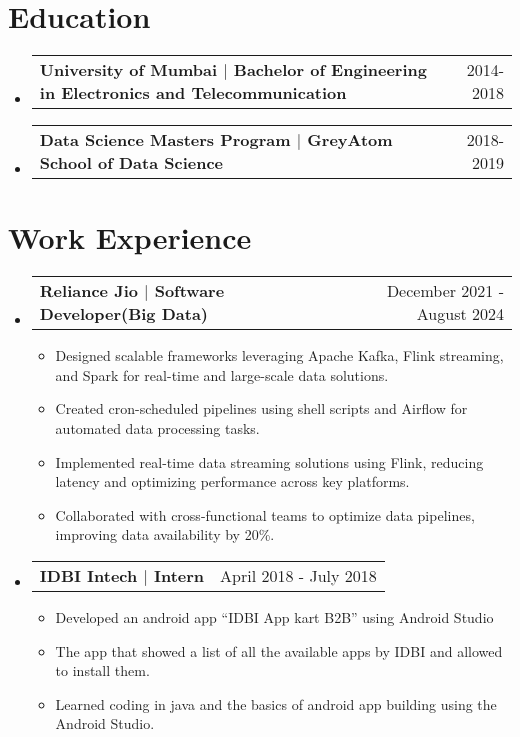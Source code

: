 \documentclass[letterpaper,10pt]{article}
\makeatletter
\newcommand{\resumeItem}[1]{
    \item\small{
      {#1 \vspace{-2pt}}
    }
  }
\newcommand{\resumeSubheading}[4]{
    \vspace{-2pt}\item
      \begin{tabular*}{0.97\textwidth}[t]{l@{\extracolsep{\fill}}r}
        \textbf{#1} & #2 \\
      \end{tabular*}\vspace{-7pt}
  }
\newcommand{\resumeEducationheading}[4]{
    \vspace{-2pt}\item
      \begin{tabular*}{0.97\textwidth}[t]{l@{\extracolsep{\fill}}r}
        \textbf{#1} & #2 \\
      \end{tabular*}\vspace{-15pt}
  }
\newcommand{\resumeSubHeadingListStart}{\begin{itemize}[leftmargin=0.15in, label={}]}
\newcommand{\resumeSubHeadingListEnd}{\end{itemize}}
\newcommand{\resumeItemListStart}{\begin{itemize}}
\newcommand{\resumeItemListEnd}{\end{itemize}\vspace{-5pt}}
\makeatother
\begin{document}
  \section{Education}
    \resumeSubHeadingListStart
      \resumeEducationheading
        {University of Mumbai $|$  {Bachelor of Engineering in Electronics and Telecommunication}}{2014-2018}
        {Bachelor of Engineering in Electronics and Telecommunication}{2014-2018}
        \resumeSubheading
        {Data Science Masters Program $|$  {GreyAtom School of Data Science}}{2018-2019}
        {GreyAtom School of Data Science}{2018-2019}
        
    \resumeSubHeadingListEnd
    


  \section{Work Experience}
    \resumeSubHeadingListStart
      \resumeSubheading
        {Reliance Jio $|$ Software Developer(Big Data) }{December 2021 - August 2024}
        {Software Developer(Big Data)}{Navi Mumbai, India}
        \resumeItemListStart
        \resumeItem{Designed scalable frameworks leveraging Apache Kafka, Flink streaming, and Spark for real-time and large-scale data solutions.}
        \resumeItem{Created cron-scheduled pipelines using shell scripts and Airflow for automated data processing tasks.}
        \resumeItem{Implemented real-time data streaming solutions using Flink, reducing latency and optimizing performance across key platforms.}
        \resumeItem{Collaborated with cross-functional teams to optimize data pipelines, improving data availability by 20\%.}
      \resumeItemListEnd     
    
     \resumeSubheading
        {IDBI Intech $|$ Intern }{April 2018 - July 2018}
        {Intern}{Navi Mumbai, India}
        \resumeItemListStart
        \resumeItem{Developed an android app “IDBI App kart B2B” using Android Studio}
        \resumeItem{The app that showed a list of all the available apps by IDBI and allowed to install them.}
        \resumeItem{Learned coding in java and the basics of android app building using the Android Studio.}
      \resumeItemListEnd     
    \resumeSubHeadingListEnd

\end{document}
